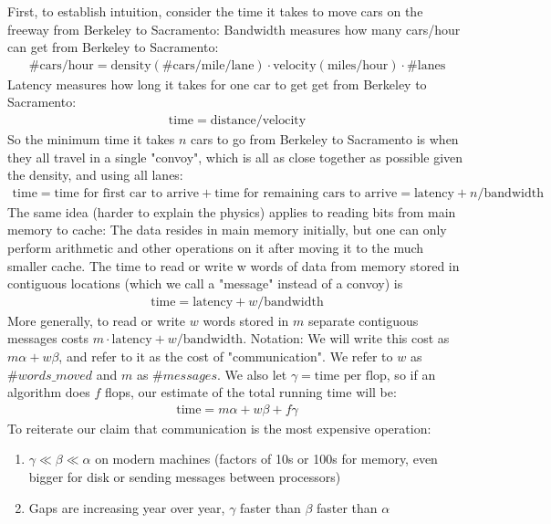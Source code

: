 \documentclass[11pt]{article}
\numberwithin{equation}{section}
\begin{document}
First, to establish intuition, consider the time it takes to move cars on the freeway from Berkeley to Sacramento:
Bandwidth measures how many cars/hour can get from Berkeley to Sacramento:
\begin{align*}
    \#\mathrm{cars}/\mathrm{hour} = \mathrm{density} (\#\mathrm{cars}/\mathrm{mile}/\mathrm{lane}) \cdot \mathrm{velocity}(\mathrm{miles}/\mathrm{hour}) \cdot \#\mathrm{lanes}
\end{align*}
Latency measures how long it takes for one car to get get from Berkeley to Sacramento:
\begin{align*}
    \mathrm{time} = \mathrm{distance} / \mathrm{velocity}
\end{align*}
So the minimum time it takes $n$ cars to go from Berkeley to Sacramento is when they all travel in a single "convoy", 
which is all as close together as possible given the density, and using all lanes:
\begin{align*}
    \mathrm{time} = \mathrm{time} \text{ for first car to arrive} + \mathrm{time} \text{ for remaining cars to arrive} = \mathrm{latency} + n/\mathrm{bandwidth}
\end{align*}
The same idea (harder to explain the physics) applies to reading bits from main memory to cache: The data resides in main memory initially, 
but one can only perform arithmetic and other operations on it after moving it to the much smaller cache. 
The time to read or write w words of data from memory stored in contiguous locations (which we call a "message" instead of a convoy) is
\begin{align*}
    \mathrm{time} = \mathrm{latency} + w / \mathrm{bandwidth}
\end{align*}
More generally, to read or write $w$ words stored in $m$ separate contiguous messages costs $m \cdot \mathrm{latency} + w / \mathrm{bandwidth}$.
Notation: We will write this cost as $m\alpha + w\beta$, and refer to it as the cost of "communication".
We refer to $w$ as $\#words\_moved$ and $m$ as $\#messages$. We also let $\gamma = \text{time per flop}$, so if an algorithm does $f$ flops,
our estimate of the total running time will be: \begin{align*}
    \mathrm{time} = m\alpha + w\beta + f\gamma
\end{align*}
To reiterate our claim that communication is the most expensive operation:\begin{enumerate}
    \item $\gamma \ll \beta \ll \alpha$ on modern machines (factors of 10s or 100s for memory, even bigger for disk or sending messages between processors)
    \item Gaps are increasing year over year, $\gamma$ faster than $\beta$ faster than $\alpha$
\end{enumerate}
\end{document}
